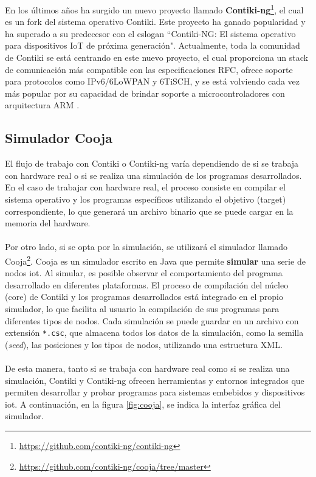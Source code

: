 En los últimos años ha surgido un nuevo proyecto llamado \textbf{Contiki-ng}\footnote{\url{https://github.com/contiki-ng/contiki-ng}}, el cual es un fork del sistema operativo Contiki. Este proyecto ha ganado popularidad y ha superado a su predecesor con el eslogan ``Contiki-NG: El sistema operativo para dispositivos IoT de próxima generación". Actualmente, toda la comunidad de Contiki se está centrando en este nuevo proyecto, el cual proporciona un stack de comunicación más compatible con las especificaciones RFC, ofrece soporte para protocolos como IPv6/6LoWPAN y 6TiSCH, y se está volviendo cada vez más popular por su capacidad de brindar soporte a microcontroladores con arquitectura ARM \cite{kurniawan2018practical}.

\subsection{Simulador Cooja}

El flujo de trabajo con Contiki o Contiki-ng varía dependiendo de si se trabaja con hardware real o si se realiza una simulación de los programas desarrollados. En el caso de trabajar con hardware real, el proceso consiste en compilar el sistema operativo y los programas específicos utilizando el objetivo (target) correspondiente, lo que generará un archivo binario que se puede cargar en la memoria del hardware.\\
\\
Por otro lado, si se opta por la simulación, se utilizará el simulador llamado Cooja\footnote{\url{https://github.com/contiki-ng/cooja/tree/master}}. Cooja es un simulador escrito en Java que permite \textbf{simular} una serie de nodos \gls{iot}. Al simular, es posible observar el comportamiento del programa desarrollado en diferentes plataformas. El proceso de compilación del núcleo (core) de Contiki y los programas desarrollados está integrado en el propio simulador, lo que facilita al usuario la compilación de sus programas para diferentes tipos de nodos. Cada simulación se puede guardar en un archivo con extensión \texttt{*.csc}, que almacena todos los datos de la simulación, como la semilla (\textit{seed}), las posiciones y los tipos de nodos, utilizando una estructura XML.\\
\\
De esta manera, tanto si se trabaja con hardware real como si se realiza una simulación, Contiki y Contiki-ng ofrecen herramientas y entornos integrados que permiten desarrollar y probar programas para sistemas embebidos y dispositivos \gls{iot}. A continuación, en la figura \ref{fig:cooja}, se indica la interfaz gráfica del simulador.

